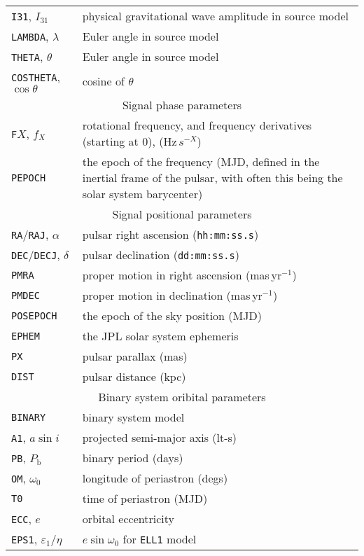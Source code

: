 \begin{longtable}{p{}|p{}}
{\tt I31}, $I_{31}$ & physical gravitational wave amplitude in source model \citep[see][]{2015MNRAS.453.4399P} \\
{\tt LAMBDA}, $\lambda$ & Euler angle in source model \citep[see][]{2015MNRAS.453.4399P} \\
{\tt THETA}, $\theta$ & Euler angle in source model \citep[see][]{2015MNRAS.453.4399P} \\
{\tt COSTHETA}, $\cos{\theta}$ & cosine of $\theta$ \\
\hline
\multicolumn{2}{c}{Signal phase parameters} \\
\hline
{\tt F}$X$, $f_X$ & rotational frequency, and frequency derivatives (starting at 0), (Hz$\,s^{-X}$) \\
{\tt PEPOCH} & the epoch of the frequency (MJD, defined in the inertial frame of the pulsar, with often this being the solar system barycenter) \\
\hline
\multicolumn{2}{c}{Signal positional parameters} \\
\hline
{\tt RA}/{\tt RAJ}, $\alpha$ & pulsar right ascension ({\tt hh:mm:ss.s}) \\
{\tt DEC}/{\tt DECJ}, $\delta$ & pulsar declination ({\tt dd:mm:ss.s}) \\
{\tt PMRA} & proper motion in right ascension (mas\,yr$^{-1}$) \\
{\tt PMDEC} & proper motion in declination (mas\,yr$^{-1}$) \\
{\tt POSEPOCH} & the epoch of the sky position (MJD) \\
{\tt EPHEM} & the JPL solar system ephemeris \\
{\tt PX} & pulsar parallax (mas) \\
{\tt DIST} & pulsar distance (kpc) \\
\hline
\multicolumn{2}{c}{Binary system oribital parameters} \\
\hline
{\tt BINARY} & binary system model \citep[see e.g.][and references therein]{1989ApJ...345..434T} \\
{\tt A1}, $a\sin{i}$ & projected semi-major axis (lt-s) \\
{\tt PB}, $P_{\text{b}}$ & binary period (days) \\
{\tt OM}, $\omega_0$ & longitude of periastron (degs) \\
{\tt T0} & time of periastron (MJD) \\
{\tt ECC}, $e$ & orbital eccentricity \\
{\tt EPS1}, $\varepsilon_1$/$\eta$ & $e\sin{\omega_0}$ for {\tt ELL1} model \citep[see Appendix in][]{2001MNRAS.326..274L} \\

\end{longtable}
